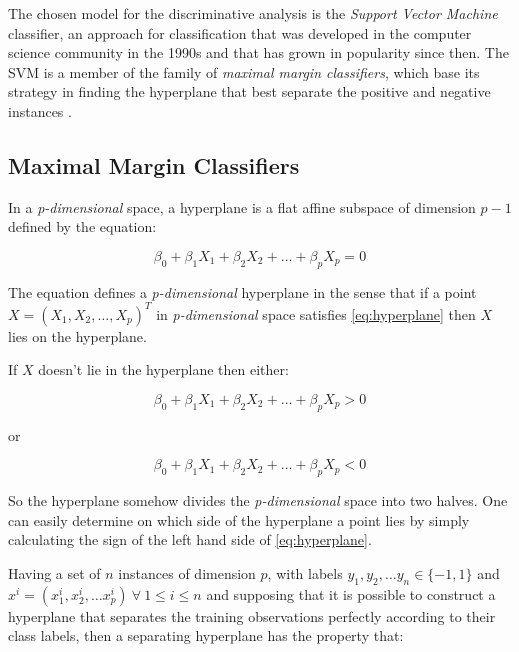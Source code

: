 The chosen model for the discriminative analysis is the \textit{Support Vector Machine} classifier,
an approach for classification that was developed in the computer science community in the 1990s
and that has grown in popularity since then. The SVM is a member of the family of
\textit{maximal margin classifiers}, which base its strategy in finding the hyperplane that
best separate the positive and negative instances \cite{svm_jwht}.

\subsection{Maximal Margin Classifiers}
In a \textit{p-dimensional} space, a hyperplane is a flat affine subspace of
dimension $p-1$ defined by the equation:

\begin{equation}
  \label{eq:hyperplane}
  \beta_{0} + \beta_{1}X_{1} + \beta_{2}X_{2} + \dotsc + \beta_{p}X_{p} = 0
\end{equation}

The equation defines a \textit{p-dimensional} hyperplane in the sense that if a point
$X=(X_{1}, X_{2}, \dotsc, X_{p})^{T}$ in \textit{p-dimensional} space
satisfies \ref{eq:hyperplane} then $X$ lies on the hyperplane.

If $X$ doesn't lie in the hyperplane then either:

\begin{equation}
  \label{eq:hyperplaneGreater}
  \beta_{0} + \beta_{1}X_{1} + \beta_{2}X_{2} + \dotsc + \beta_{p}X_{p} > 0
\end{equation}

\begin{center}or\end{center}

\begin{equation}
  \label{eq:hyperplaneLesser}
  \beta_{0} + \beta_{1}X_{1} + \beta_{2}X_{2} + \dotsc + \beta_{p}X_{p} < 0
\end{equation}

So the hyperplane somehow divides the \textit{p-dimensional} space into two halves. One can
easily determine on which side of the hyperplane a point lies by simply calculating the sign
of the left hand side of \ref{eq:hyperplane}.

Having a set of $n$ instances of dimension $p$, with labels
$y_{1}, y_{2}, \dotsc y_{n} \in \{-1,1\}$ and $x^{i} = (x^{i}_{1}, x^{i}_{2}, \dotsc x^{i}_{p}) \ \forall \ 1 \leq i \leq {n}$ and supposing that it is possible to construct a hyperplane that
separates the training observations perfectly according to their class labels, then a
separating hyperplane has the property that:

